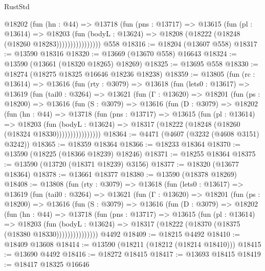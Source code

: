 \begin{lexlean}{RustStd}
\begin{coremodule}
                    @18202
                      (fun (hn : @44) =>
                      @13718
                        (fun (pns : @13717) =>
                        @13615
                          (fun (pl : @13614) =>
                          @18203
                            (fun (bodyL : @13624) =>
                            @18208 (@18222 (@18248 (@18260 @18283))))))))))))))))
    @558
@18316 := @18204 (@13607 @558)
@18317 := @13590 @18316
@18320 := @13669 (@13670 @558) @16643
@18324 := @13590 (@13661 (@18320 @18265) @18269)
@18325 := @13695 @558
@18330 := @18274 (@18275 @18325 @16646 @18236 @18238)
@18359 := @13805
    (fun (rc : @13614) =>
    @13616
      (fun (rty : @3079) =>
      @13618
        (fun (lets0 : @13617) =>
        @13619
          (fun (tail0 : @3264) =>
          @13621
            (fun (Γ : @13620) =>
            @18201
              (fun (ps : @18200) =>
              @13616
                (fun (S : @3079) =>
                @13616
                  (fun (D : @3079) =>
                  @18202
                    (fun (hn : @44) =>
                    @13718
                      (fun (pns : @13717) =>
                      @13615
                        (fun (pl : @13614) =>
                        @18203
                          (fun (bodyL : @13624) =>
                          @18317 (@18222 (@18248 (@18260 (@18324 @18330))))))))))))))))
@18364 := @4471 (@4607 (@3232 (@4608 @3151) @3242))
@18365 := @18359 @18364
@18366 := @18233 @18364
@18370 := @13590 (@18225 (@18366 @18239) @18246)
@18371 := @18255 @18364
@18375 := @13590 (@13720 (@18371 @18239) @3156)
@18377 := @18320 (@13677 @18364)
@18378 := @13661 @18377
@18380 := @13590 (@18378 @18269)
@18408 := @13808
    (fun (rty : @3079) =>
    @13618
      (fun (lets0 : @13617) =>
      @13619
        (fun (tail0 : @3264) =>
        @13621
          (fun (Γ : @13620) =>
          @18201
            (fun (ps : @18200) =>
            @13616
              (fun (S : @3079) =>
              @13616
                (fun (D : @3079) =>
                @18202
                  (fun (hn : @44) =>
                  @13718
                    (fun (pns : @13717) =>
                    @13615
                      (fun (pl : @13614) =>
                      @18203
                        (fun (bodyL : @13624) =>
                        @18317 (@18222 (@18370 (@18375 (@18380 @18330)))))))))))))))
    @4492
@18409 := @18215 @4492
@18410 := @18409 @13608
@18414 := @13590 (@18211 (@18212 (@18214 @18410)))
@18415 := @13690 @4492
@18416 := @18272 @18415
@18417 := @13693 @18415
@18419 := @18417 @18325 @16646

\end{coremodule}
\end{lexlean}
